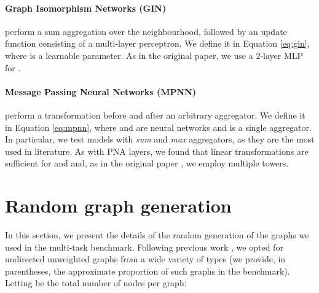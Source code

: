 \documentclass{article}
\begin{document}
\paragraph{Graph Isomorphism Networks (GIN)} \cite{xu2018gin} perform a sum aggregation over the neighbourhood, followed by an update function  consisting of a multi-layer perceptron. We define it in Equation \ref{eq:gin}, where  is a learnable parameter. As in the original paper, we use a 2-layer MLP for .




\paragraph{Message Passing Neural Networks (MPNN)} \cite{gilmer2017mpnn}  perform a transformation before and after an arbitrary aggregator. We define it in Equation \ref{eq:mpnn}, where  and  are neural networks and  is a single aggregator. In particular, we test models with \textit{sum} and \textit{max} aggregators, as they are the most used in literature. As with PNA layers, we found that linear transformations are sufficient for  and  and, as in the original paper \cite{gilmer2017mpnn}, we employ multiple towers.


\section{Random graph generation}
\label{app:graph_generation}

In this section, we present the details of the random generation of the graphs we used in the multi-task benchmark. Following previous work \cite{velickovic2019neural,you2019positionaware}, we opted for undirected unweighted graphs from a wide variety of types (we provide, in parentheses, the approximate proportion of such graphs in the benchmark). Letting  be the total number of nodes per graph:
\end{document}
